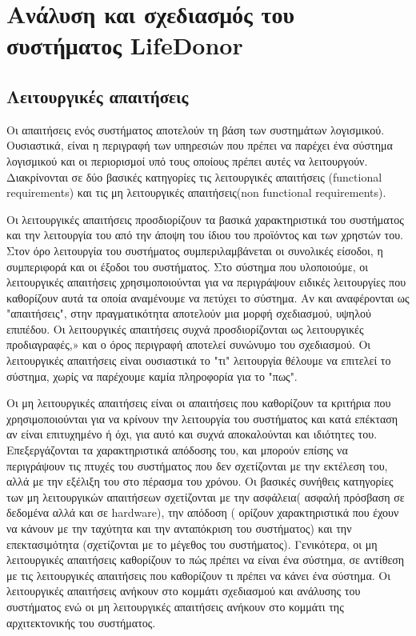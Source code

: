 \graphicspath{ {Figures/system_analysis/} }

\chapter{Ανάλυση και σχεδιασμός του συστήματος LifeDonor}\label{ch:Analysis of LifeDonor}
\section{Λειτουργικές απαιτήσεις}

	Οι απαιτήσεις ενός συστήματος αποτελούν τη βάση των συστημάτων λογισμικού. Ουσιαστικά, είναι η περιγραφή των υπηρεσιών που πρέπει να παρέχει ένα σύστημα λογισμικού και οι περιορισμοί υπό τους οποίους πρέπει αυτές να λειτουργούν. Διακρίνονται σε δύο βασικές κατηγορίες τις λειτουργικές απαιτήσεις (functional requirements) και τις μη λειτουργικές απαιτήσεις(non functional requirements). 
	
	Οι λειτουργικές απαιτήσεις προσδιορίζουν τα βασικά χαρακτηριστικά του συστήματος και την λειτουργία του από την άποψη του ίδιου του προϊόντος και των χρηστών του. Στον όρο λειτουργία του συστήματος συμπεριλαμβάνεται οι συνολικές είσοδοι, η συμπεριφορά και οι έξοδοι του συστήματος. Στο σύστημα που υλοποιούμε, οι λειτουργικές απαιτήσεις χρησιμοποιούνται για να περιγράψουν ειδικές λειτουργίες που καθορίζουν αυτά τα οποία αναμένουμε να πετύχει το σύστημα. Αν και αναφέρονται ως "απαιτήσεις", στην πραγματικότητα αποτελούν μια μορφή σχεδιασμού, υψηλού επιπέδου. Οι λειτουργικές απαιτήσεις συχνά προσδιορίζονται ως λειτουργικές προδιαγραφές,» και ο όρος περιγραφή αποτελεί συνώνυμο του σχεδιασμού. Οι λειτουργικές απαιτήσεις είναι ουσιαστικά το "τι" λειτουργία θέλουμε να επιτελεί το σύστημα, χωρίς να παρέχουμε καμία πληροφορία για το "πως".
	
	Οι μη λειτουργικές απαιτήσεις είναι οι απαιτήσεις που καθορίζουν τα κριτήρια που χρησιμοποιούνται για να κρίνουν την λειτουργία του συστήματος και κατά επέκταση  αν είναι επιτυχημένο ή όχι, για αυτό και συχνά αποκαλούνται και ιδιότητες του. Επεξεργάζονται τα χαρακτηριστικά απόδοσης του, και μπορούν επίσης να περιγράψουν τις πτυχές του συστήματος που δεν σχετίζονται με την εκτέλεση του, αλλά με την εξέλιξη του στο πέρασμα του χρόνου. Οι βασικές συνήθεις κατηγορίες των μη λειτουργικών απαιτήσεων σχετίζονται με την ασφάλεια( ασφαλή πρόσβαση σε δεδομένα αλλά και σε hardware), την απόδοση ( ορίζουν χαρακτηριστικά που έχουν να κάνουν με την ταχύτητα και την ανταπόκριση του συστήματος) και την επεκτασιμότητα (σχετίζονται με το μέγεθος του συστήματος). Γενικότερα, οι μη λειτουργικές απαιτήσεις καθορίζουν το πώς πρέπει να είναι ένα σύστημα, σε αντίθεση με τις λειτουργικές απαιτήσεις που καθορίζουν τι πρέπει να κάνει ένα σύστημα. Οι λειτουργικές απαιτήσεις ανήκουν στο κομμάτι σχεδιασμού και ανάλυσης του συστήματος ενώ οι μη λειτουργικές απαιτήσεις ανήκουν στο κομμάτι της αρχιτεκτονικής του συστήματος.
	
